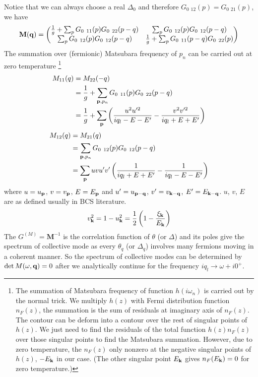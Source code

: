 Notice that we can always choose a real $\Delta_{0}$ and therefore $G_{0}{\ _{12}}(p)=G_{0}{\ _{21}}(p)$, we have 
\begin{equation}
\mathbf{M(q)}=
\begin{pmatrix}
\nth{g}+\sum_{p}G_{0}{\ }_{11}(p)G_{0}{\ }_{22}(p-q)&\sum_{p}G_{0}{\ }_{12}(p)G_{0}{\ }_{12}(p-q)\\
\sum_{p}G_{0}{\ }_{12}(p)G_{0}{\ }_{12}(p-q)&\nth{g}+\sum_{p}G_{0}{\ }_{11}(p-q)G_{0}{\ }_{22}(p)
\end{pmatrix}
\end{equation}
The summation over (fermionic) Matsubara frequency of $p_{n}$ can be carried out at zero temperature
\footnote{\label{foot:intro:sum}The summation of Matsubara frequency of function $h(i\omega_{n})$ is carried out by the normal trick.  We  multiply $h(z)$ with Fermi distribution function $n_{F}(z)$,  the summation is the sum of residuals at imaginary axis of $n_{F}(z)$.  The contour can be deform into a contour over the rest of singular points of $h(z)$. We just need to find the residuals of the total function $h(z)n_{F}(z)$ over those singular points to find the Matsubara summation.   However, due to zero temperature, the  $n_{F}(z)$ only nonzero at the negative singular points of $h(z)$, $-E_{\mathbf{k}}$ in our case.  (The other singular point $E_{\mathbf{k}}$ gives $n_{F}(E_{\mathbf{k}})=0$ for zero temperature.)}
\begin{equation}
\begin{split}
M_{11}(q)&=M_{22}(-q)\\
	&=\nth{g}+\sum_{\vp{,}p_{n}}G_{0}{\ }_{11}(p)G_{0}{\ }_{22}(p-q)\\
	&=\nth{g}+\sum_{\vp}\br{\frac{u^{2}u'^{2}}{iq_{l}-E-E'}-\frac{v^{2}v'^{2}}{iq_{l}+E+E'}}
\end{split}
\end{equation}
\begin{equation}
\begin{split}
M_{12}(q)&=M_{21}(q)\\
	&=\sum_{\mathbf{p}{,}p_{n}}G_{0}{\ }_{12}(p)G_{0}{\ }_{12}(p-q)\\
	&=\sum_{\mathbf{p}}uvu'v'\left(\frac{1}{iq_{l}+E+E'}-\frac{1}{iq_{l}-E-E'}\right)
\end{split}
\end{equation}
where $u=u_{\mathbf{p}}$, $v=v_{\mathbf{p}}$, $E=E_{\mathbf{p}}$ and $u'=u_{\mathbf{p}-\mathbf{q}}$, $v'=v_{\mathbf{k}-\mathbf{q}}$, $E'=E_{\mathbf{k}-\mathbf{q}}$.  $u$, $v$, $E$ are as defined usually in BCS literature. 
\begin{equation}
v_{\mathbf{k}}^{2}=1-u_{\mathbf{k}}^{2}=\frac{1}{2}\left(1-\frac{\xi_{\mathbf{k}}}{E_{\mathbf{k}}}\right)
\end{equation}
 The $G^{(M)}=\mathbf{M}^{-1}$ is the correlation function of $\theta$ (or $\Delta$) and its poles give the spectrum of collective mode as every  $\theta_{q}$ (or $\Delta_{q}$) involves many fermions moving in a coherent manner.  So the spectrum of collective modes can be determined by $\det{M(\omega,\ensuremath{\mathbf{q}})}=0$ after we analytically continue for the frequency $iq_{l}\rightarrow\omega+i0^{+}$.  
 
